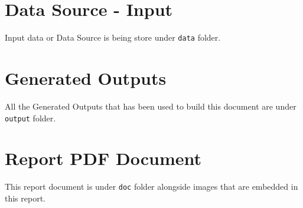 \documentclass[12pt, a4paper]{article}
\begin{document}
\section{Data Source - Input}\label{apx:data}
Input data or Data Source is being store under \texttt{data} folder.

\section{Generated Outputs}\label{apx:reports}
All the Generated Outputs that has been used to build this document are under \texttt{output} folder.

\section{Report PDF Document}
This report document is under \texttt{doc} folder alongside images that are embedded in this report.
\end{document}
